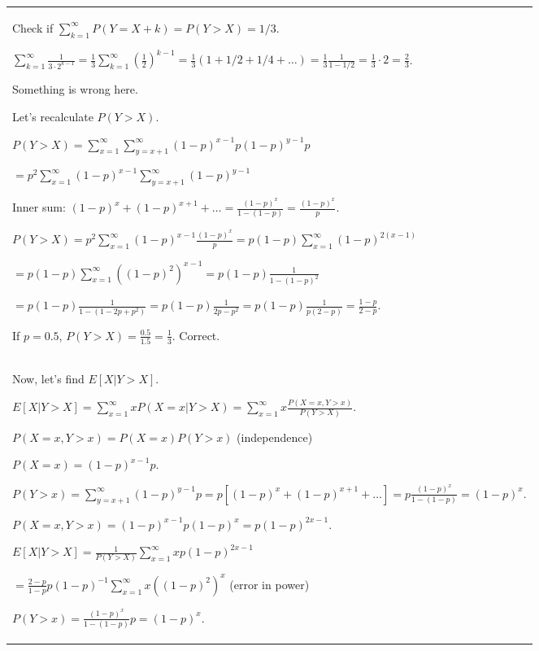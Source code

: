 \documentclass{article}
\theoremstyle{plain}
\theoremstyle{definition}
\theoremstyle{remark}
\newcommand{\defaultlightblue}[1]{{\leavevmode\color{bluec}#1}}
\begin{document}
\begin{longtable}{@{}p{\columnwidth}@{}}
{Check if $\sum_{k=1}^\infty P(Y = X + k) = P(Y > X) = 1/3$.

$\sum_{k=1}^\infty \frac{1}{3 \cdot 2^{k-1}} = \frac{1}{3} \sum_{k=1}^\infty (\frac{1}{2})^{k-1} = \frac{1}{3} (1 + 1/2 + 1/4 + \dots) = \frac{1}{3} \frac{1}{1 - 1/2} = \frac{1}{3} \cdot 2 = \frac{2}{3}$.

Something is wrong here.



Let's recalculate $P(Y > X)$.

$P(Y > X) = \sum_{x=1}^\infty \sum_{y=x+1}^\infty (1-p)^{x-1} p (1-p)^{y-1} p$

$= p^2 \sum_{x=1}^\infty (1-p)^{x-1} \sum_{y=x+1}^\infty (1-p)^{y-1}$

Inner sum: $(1-p)^x + (1-p)^{x+1} + \dots = \frac{(1-p)^x}{1 - (1-p)} = \frac{(1-p)^x}{p}$.

$P(Y > X) = p^2 \sum_{x=1}^\infty (1-p)^{x-1} \frac{(1-p)^x}{p} = p (1-p) \sum_{x=1}^\infty (1-p)^{2(x-1)}$

$= p (1-p) \sum_{x=1}^\infty ((1-p)^2)^{x-1} = p (1-p) \frac{1}{1 - (1-p)^2}$

$= p (1-p) \frac{1}{1 - (1 - 2p + p^2)} = p (1-p) \frac{1}{2p - p^2} = p (1-p) \frac{1}{p(2-p)} = \frac{1-p}{2-p}$.

If $p = 0.5$, $P(Y > X) = \frac{0.5}{1.5} = \frac{1}{3}$. Correct.
}
\\
\defaultlightblue{
Now, let's find $E[X | Y > X]$.

$E[X | Y > X] = \sum_{x=1}^\infty x P(X=x | Y > X) = \sum_{x=1}^\infty x \frac{P(X=x, Y > x)}{P(Y > X)}$.



$P(X=x, Y > x) = P(X=x) P(Y > x)$ (independence)

$P(X=x) = (1-p)^{x-1} p$.

$P(Y > x) = \sum_{y=x+1}^\infty (1-p)^{y-1} p = p [(1-p)^x + (1-p)^{x+1} + \dots] = p \frac{(1-p)^x}{1 - (1-p)} = (1-p)^x$.



$P(X=x, Y > x) = (1-p)^{x-1} p (1-p)^x = p (1-p)^{2x-1}$.



$E[X | Y > X] = \frac{1}{P(Y > X)} \sum_{x=1}^\infty x p (1-p)^{2x-1}$

$= \frac{2-p}{1-p} p (1-p)^{-1} \sum_{x=1}^\infty x ((1-p)^2)^x$ (error in power)



$P(Y > x) = \frac{(1-p)^x}{1 - (1-p)} p = (1-p)^x$.



}
\end{longtable}
\end{document}
